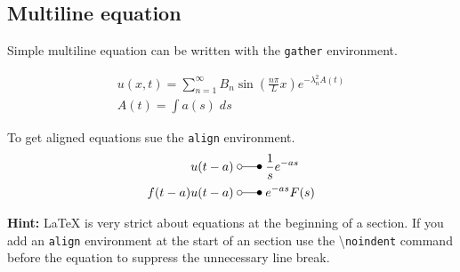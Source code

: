\documentclass[a4paper,10pt,landscape]{article}
\begin{document}
\begin{multicols*}{3}
    \subsection{Multiline equation}
    Simple multiline equation can be written with the \texttt{gather} environment.

    \begin{gather*}
        u(x,t) =\sum_{n=1}^\infty B_n\sin(\frac{n\pi}Lx)e^{-\lambda_n^2 A(t)} \\
        A(t)=\int a(s)\;ds
    \end{gather*}

    To get aligned equations sue the \texttt{align} environment.
    \begin{align*}
        u(t-a)       \; & \laplace\; \frac{1}{s}e^{-as} \\
        f(t-a)u(t-a) \; & \laplace\; e^{-as}F(s)
    \end{align*}

    \textbf{Hint:} \LaTeX{} is very strict about equations at the beginning of a section. 
    If you add an \texttt{align} environment at the start of an section use the 
    \textbackslash{}\texttt{noindent} command before the equation to suppress the unnecessary 
    line break.






\end{multicols*}
\end{document}
